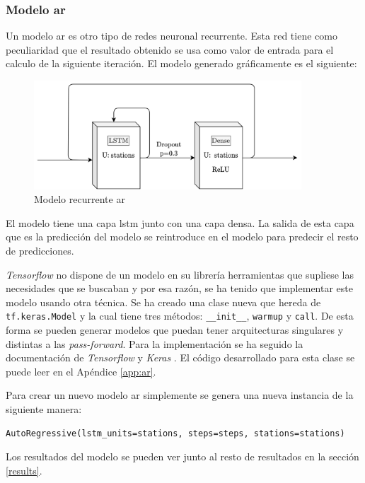 \subsubsection{Modelo \acrfull{ar}}\label{model_ar}


Un modelo \acrshort{ar} es otro tipo de redes neuronal recurrente. Esta red tiene como peculiaridad que el resultado obtenido se usa como valor de entrada para el calculo de la siguiente iteración. El modelo generado gráficamente es el siguiente:
\begin{figure}[H]
    \centering
    \includegraphics[width=10cm]{images/solution/models/AR.png}
    \caption{Modelo recurrente \acrshort{ar}}
    \label{fig:dense-model}
\end{figure}

El modelo tiene una capa \acrshort{lstm} junto con una capa densa. La salida de esta capa que es la predicción del modelo se reintroduce en el modelo para predecir el resto de predicciones.
\newline

\textit{Tensorflow} no dispone de un modelo en su librería herramientas que supliese las necesidades que se buscaban y por esa razón, se ha tenido que implementar este modelo usando otra técnica. Se ha creado una clase nueva que hereda de \small\verb|tf.keras.Model| y la cual tiene tres métodos: \small\verb|__init__|, \small\verb|warmup| y \small\verb|call|. De esta forma se pueden generar modelos que puedan tener arquitecturas singulares y distintas a las \textit{pass-forward}. Para la implementación se ha seguido la documentación de \textit{Tensorflow} \cite{tensorflow2015-whitepaper} y \textit{Keras} \cite{keras}. El código desarrollado para esta clase se puede leer en el Apéndice \ref{app:ar}.
\newline


Para crear un nuevo modelo \acrshort{ar} simplemente se genera una nueva instancia de la siguiente manera:
\begin{verbatim}
AutoRegressive(lstm_units=stations, steps=steps, stations=stations)
\end{verbatim}

Los resultados del modelo se pueden ver junto al resto de resultados en la sección \ref{results}.